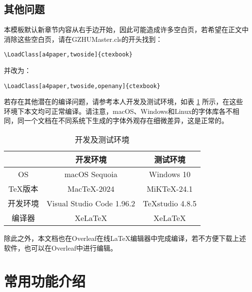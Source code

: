 \documentclass{GZHUMaster}
\begin{document}
\section{其他问题}
本模板默认新章节内容从右手边开始，因此可能造成许多空白页，若希望在正文中消除这些空白页，请在GZHUMaster.cls的开头找到：\par
\verb|\LoadClass[a4paper,twoside]{ctexbook}|\par
并改为：\par
\verb|\LoadClass[a4paper,twoside,openany]{ctexbook}|\par
若存在其他潜在的编译问题，请参考本人开发及测试环境，如表 \ref{tab1} 所示，在这些环境下本文均可正常编译。请注意，macOS、Windows和Linux的字体库各不相同，同一个文档在不同系统下生成的字体外观存在细微差异，这是正常的。\par
\begin{table}[h]
  \centering
  \caption{开发及测试环境}
  \begin{tabular}{ccc}
    \hline
    & 开发环境 & 测试环境 \\
    \hline
    OS & macOS Sequoia & Windows 10 \\
    TeX版本 & MacTeX-2024 & MiKTeX-24.1 \\
    开发环境 & Visual Studio Code 1.96.2 & TeXstudio 4.8.5 \\
    编译器 & XeLaTeX & XeLaTeX \\
    \hline
  \end{tabular}
  \label{tab1}
\end{table}
除此之外，本文档也在Overleaf在线LaTeX编辑器中完成编译，若不方便下载上述软件，也可以在Overleaf中进行编辑。
\chapter{常用功能介绍}
\end{document}
